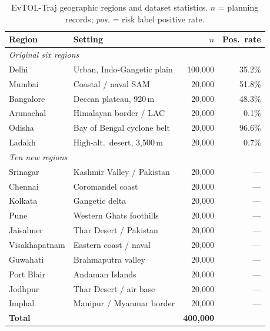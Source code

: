 \documentclass{article}
\theoremstyle{plain}
\theoremstyle{definition}
\begin{document}
\begin{table}[t]
\caption{EvTOL-Traj geographic regions and dataset statistics.
  $n$ = planning records; \emph{pos.} = risk label positive rate.}
\label{tab:regions}
\vskip 0.1in
\begin{center}
\begin{small}
\begin{tabular}{llrr}
\toprule
Region & Setting & $n$ & Pos.\ rate \\
\midrule
\multicolumn{4}{l}{\textit{Original six regions}} \\
Delhi          & Urban, Indo-Gangetic plain   & 100{,}000 & 35.2\% \\
Mumbai         & Coastal / naval SAM          &  20{,}000 & 51.8\% \\
Bangalore      & Deccan plateau, 920\,m       &  20{,}000 & 48.3\% \\
Arunachal      & Himalayan border / LAC       &  20{,}000 &  0.1\% \\
Odisha         & Bay of Bengal cyclone belt   &  20{,}000 & 96.6\% \\
Ladakh         & High-alt.\ desert, 3{,}500\,m &  20{,}000 &  0.7\% \\
\midrule
\multicolumn{4}{l}{\textit{Ten new regions}} \\
Srinagar       & Kashmir Valley / Pakistan    &  20{,}000 & --- \\
Chennai        & Coromandel coast             &  20{,}000 & --- \\
Kolkata        & Gangetic delta               &  20{,}000 & --- \\
Pune           & Western Ghats foothills      &  20{,}000 & --- \\
Jaisalmer      & Thar Desert / Pakistan       &  20{,}000 & --- \\
Visakhapatnam  & Eastern coast / naval        &  20{,}000 & --- \\
Guwahati       & Brahmaputra valley           &  20{,}000 & --- \\
Port Blair     & Andaman Islands              &  20{,}000 & --- \\
Jodhpur        & Thar Desert / air base       &  20{,}000 & --- \\
Imphal         & Manipur / Myanmar border     &  20{,}000 & --- \\
\midrule
\textbf{Total} &                              & \textbf{400{,}000} & \\
\bottomrule
\end{tabular}
\end{small}
\end{center}
\vskip -0.1in
\end{table}
\end{document}

